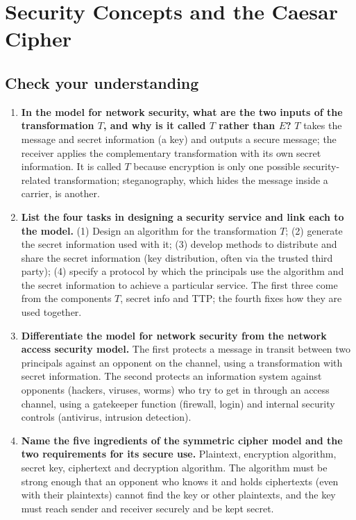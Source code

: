 \section{Security Concepts and the Caesar Cipher}\label{q:01_intro}

\subsection*{Check your understanding}
\begin{enumerate}[leftmargin=1.6em,itemsep=3pt]
  \item \textbf{In the model for network security, what are the two inputs of the transformation $T$, and why is it called $T$ rather than $E$?} $T$ takes the message and secret information (a key) and outputs a secure message; the receiver applies the complementary transformation with its own secret information. It is called $T$ because encryption is only one possible security-related transformation; steganography, which hides the message inside a carrier, is another.
  \item \textbf{List the four tasks in designing a security service and link each to the model.} (1) Design an algorithm for the transformation $T$; (2) generate the secret information used with it; (3) develop methods to distribute and share the secret information (key distribution, often via the trusted third party); (4) specify a protocol by which the principals use the algorithm and the secret information to achieve a particular service. The first three come from the components $T$, secret info and TTP; the fourth fixes how they are used together.
  \item \textbf{Differentiate the model for network security from the network access security model.} The first protects a message in transit between two principals against an opponent on the channel, using a transformation with secret information. The second protects an information system against opponents (hackers, viruses, worms) who try to get in through an access channel, using a gatekeeper function (firewall, login) and internal security controls (antivirus, intrusion detection).
  \item \textbf{Name the five ingredients of the symmetric cipher model and the two requirements for its secure use.} Plaintext, encryption algorithm, secret key, ciphertext and decryption algorithm. The algorithm must be strong enough that an opponent who knows it and holds ciphertexts (even with their plaintexts) cannot find the key or other plaintexts, and the key must reach sender and receiver securely and be kept secret.

\end{enumerate}
